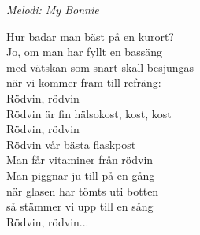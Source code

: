{\footnotesize\textit{Melodi: My Bonnie}}\par
\vspace{10pt}
Hur badar man bäst på en kurort?\\
Jo, om man har fyllt en bassäng\\
med vätskan som snart skall besjungas\\
när vi kommer fram till refräng:\\
Rödvin, rödvin\\
Rödvin är fin hälsokost, kost, kost\\
Rödvin, rödvin\\
Rödvin vår bästa flaskpost\\
Man får vitaminer från rödvin\\
Man piggnar ju till på en gång\\
när glasen har tömts uti botten\\
så stämmer vi upp till en sång\\
Rödvin, rödvin...
